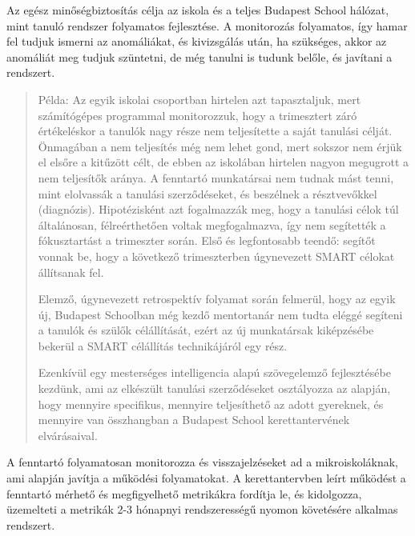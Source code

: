 Az egész minőségbiztosítás célja az iskola és a teljes  Budapest School hálózat, mint tanuló rendszer folyamatos fejlesztése. A monitorozás folyamatos, így hamar fel tudjuk ismerni az anomáliákat, és kivizsgálás után, ha szükséges, akkor az anomáliát meg tudjuk szüntetni, de még tanulni is tudunk belőle, és javítani a rendszert.
\begin{quote}
Példa: Az egyik iskolai csoportban hirtelen azt tapasztaljuk, mert számítógépes programmal monitorozzuk, hogy a trimesztert záró értékeléskor a tanulók nagy része nem teljesítette a saját tanulási célját. Önmagában a nem teljesítés még nem lehet gond, mert sokszor nem érjük el elsőre a kitűzött célt, de ebben az iskolában hirtelen nagyon megugrott a nem teljesítők aránya. A fenntartó munkatársai nem tudnak mást tenni, mint elolvassák a tanulási szerződéseket, és beszélnek a résztvevőkkel (diagnózis). Hipotézisként azt fogalmazzák meg, hogy a tanulási célok túl általánosan, félreérthetően voltak megfogalmazva, így nem segítették a fókusztartást a trimeszter során. Első és legfontosabb teendő: segítőt vonnak be, hogy a következő trimeszterben úgynevezett SMART\cite{wiki:smart} célokat állítsanak fel.

Elemző, úgynevezett retrospektív folyamat során felmerül, hogy az egyik új, Budapest Schoolban még kezdő mentortanár nem tudta eléggé segíteni a tanulók és szülők célállítását, ezért az új munkatársak kiképzésébe bekerül a SMART célállítás technikájáról egy rész.

Ezenkívül egy mesterséges intelligencia alapú szövegelemző fejlesztésébe kezdünk, ami az elkészült tanulási szerződéseket osztályozza az alapján, hogy mennyire specifikus, mennyire teljesíthető az adott gyereknek, és mennyire van összhangban a Budapest School kerettantervének elvárásaival.
\end{quote}




A fenntartó folyamatosan monitorozza és visszajelzéseket ad a mikroiskoláknak, ami alapján javítja a működési folyamatokat. A kerettantervben leírt működést a fenntartó mérhető és megfigyelhető metrikákra fordítja le, és kidolgozza, üzemelteti a metrikák 2-3 hónapnyi rendszerességű nyomon követésére alkalmas rendszert.

